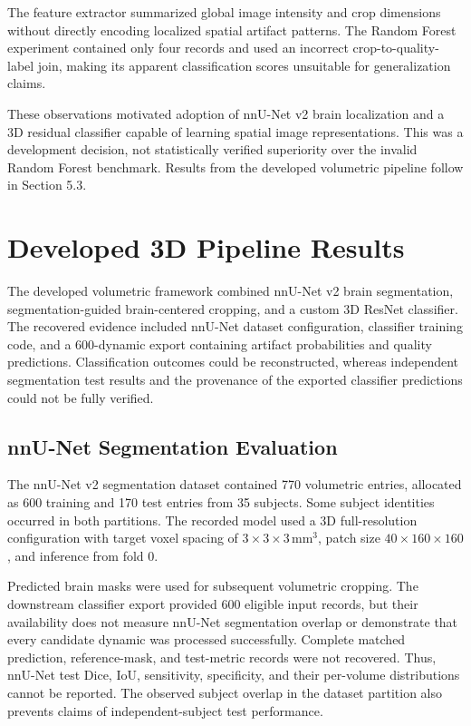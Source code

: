 The feature extractor summarized global image intensity and crop dimensions without directly encoding localized spatial artifact patterns. The Random Forest experiment contained only four records and used an incorrect crop-to-quality-label join, making its apparent classification scores unsuitable for generalization claims.

These observations motivated adoption of nnU-Net v2 brain localization and a 3D residual classifier capable of learning spatial image representations. This was a development decision, not statistically verified superiority over the invalid Random Forest benchmark. Results from the developed volumetric pipeline follow in Section 5.3.

\section{Developed 3D Pipeline Results}
\label{sec:results_3d_pipeline}

The developed volumetric framework combined nnU-Net v2 brain segmentation, segmentation-guided brain-centered cropping, and a custom 3D ResNet classifier. The recovered evidence included nnU-Net dataset configuration, classifier training code, and a 600-dynamic export containing artifact probabilities and quality predictions. Classification outcomes could be reconstructed, whereas independent segmentation test results and the provenance of the exported classifier predictions could not be fully verified.

\subsection{nnU-Net Segmentation Evaluation}
\label{subsec:nnunet_segmentation_evaluation}

The nnU-Net v2 segmentation dataset contained 770 volumetric entries, allocated as 600 training and 170 test entries from 35 subjects. Some subject identities occurred in both partitions. The recorded model used a 3D full-resolution configuration with target voxel spacing of $3\times3\times3$\,mm$^3$, patch size $40\times160\times160$, and inference from fold 0.

Predicted brain masks were used for subsequent volumetric cropping. The downstream classifier export provided 600 eligible input records, but their availability does not measure nnU-Net segmentation overlap or demonstrate that every candidate dynamic was processed successfully. Complete matched prediction, reference-mask, and test-metric records were not recovered. Thus, nnU-Net test Dice, IoU, sensitivity, specificity, and their per-volume distributions cannot be reported. The observed subject overlap in the dataset partition also prevents claims of independent-subject test performance.


